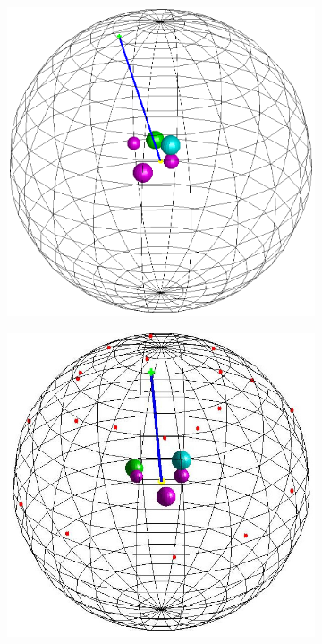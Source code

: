 \begin{figure}[htb]
\centering
\begin{subfigure}[t]{0.45\textwidth}
    \includegraphics[width=\textwidth]{figures/active_counting/viewingsphere2.png}
\end{subfigure}\quad \begin{subfigure}[t]{0.45\textwidth}
    \includegraphics[width=\textwidth]{figures/active_counting/viewpoints.jpg}

\end{subfigure}
\end{figure}
